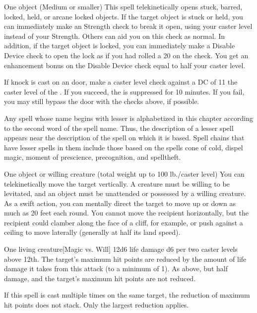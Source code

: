 \spellrng{\rngclose}
\begin{spelltarget}{One object (Medium or smaller)}
    \spelleffect This spell telekinetically opens stuck, barred, locked, held, or arcane locked objects. If the target object is stuck or held, you can immediately make an Strength check to break it open, using your caster level instead of your Strength. Others can aid you on this check as normal. In addition, if the target object is locked, you can immediately make a Disable Device check to open the lock as if you had rolled a 20 on the check. You get an enhancement bonus on the Disable Device check equal to half your caster level.
\end{spelltarget}
\spellnotes If knock is cast on an  door, make a caster level check against a DC of 11 \add the caster level of the . If you succeed, the  is suppressed for 10 minutes. If you fail, you may still bypass the door with the checks above, if possible.

\par Any spell whose name begins with lesser is alphabetized in this chapter according to the second word of the spell name. Thus, the description of a lesser spell appears near the description of the spell on which it is based. Spell chains that have lesser spells in them include those based on the spells cone of cold, dispel magic, moment of prescience, precognition, and spelltheft.

\spellrng{\rngclose}
\spelldur{\durshort \dismissable}
\begin{spelltarget}{One object or willing creature (total weight up to 100 lb./caster level)}
    \spelleffect You can telekinetically move the target vertically. A creature must be willing to be levitated, and an object must be unattended or possessed by a willing creature. As a swift action, you can mentally direct the target to move up or down as much as 20 feet each round. You cannot move the recipient horizontally, but the recipient could clamber along the face of a cliff, for example, or push against a ceiling to move laterally (generally at half its land speed).
\end{spelltarget}

\spellrng{\rngmed}
\begin{spelltarget}{One living creature}[Magic vs. Will]
    \spellsuccess 12d6 life damage \add d6 per two caster levels above 12th. The target's maximum hit points are reduced by the amount of life damage it takes from this attack (to a minimum of 1).
    \spellfailure As above, but half damage, and the target's maximum hit points are not reduced.
\end{spelltarget}
\spellnotes If this spell is cast multiple times on the same target, the reduction of maximum hit points does not stack. Only the largest reduction applies.

